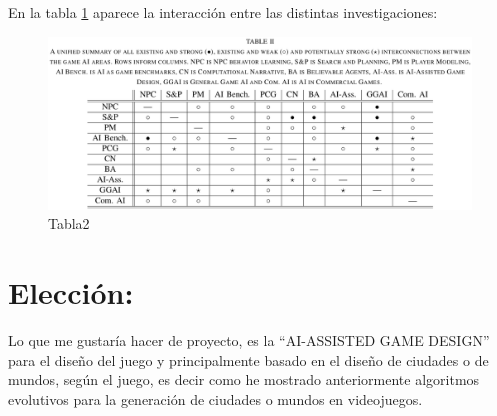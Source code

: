 En la tabla \ref{fig:ejemplo} aparece la interacción entre las distintas investigaciones:\\

\begin{figure}[htb]
  \centering
    \includegraphics[width=15cm]{./eps/tabla2.eps}
    \vspace{2cm}
  \caption{Tabla2}
  \label{fig:ejemplo}
\end{figure}

\section{Elección:}

Lo que me gustaría hacer de proyecto, es la “AI-ASSISTED GAME DESIGN” para el diseño del juego y principalmente basado en el diseño de ciudades o de mundos, según el juego, es decir como he mostrado anteriormente algoritmos evolutivos para la generación de ciudades o mundos en videojuegos.\\